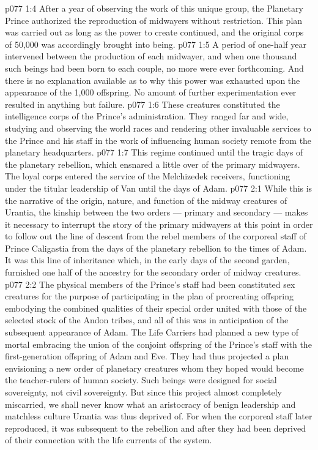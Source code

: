 \vs p077 1:4 After a year of observing the work of this unique group, the Planetary Prince authorized the reproduction of midwayers without restriction. This plan was carried out as long as the power to create continued, and the original corps of 50,000 was accordingly brought into being.
\vs p077 1:5 A period of one\hyp{}half year intervened between the production of each midwayer, and when one thousand such beings had been born to each couple, no more were ever forthcoming. And there is no explanation available as to why this power was exhausted upon the appearance of the 1,000 offspring. No amount of further experimentation ever resulted in anything but failure.
\vs p077 1:6 \pc These creatures constituted the intelligence corps of the Prince’s administration. They ranged far and wide, studying and observing the world races and rendering other invaluable services to the Prince and his staff in the work of influencing human society remote from the planetary headquarters.
\vs p077 1:7 This regime continued until the tragic days of the planetary rebellion, which ensnared a little over  of the primary midwayers. The loyal corps entered the service of the Melchizedek receivers, functioning under the titular leadership of Van until the days of Adam.
\vs p077 2:1 While this is the narrative of the origin, nature, and function of the midway creatures of Urantia, the kinship between the two orders --- primary and secondary --- makes it necessary to interrupt the story of the primary midwayers at this point in order to follow out the line of descent from the rebel members of the corporeal staff of Prince Caligastia from the days of the planetary rebellion to the times of Adam. It was this line of inheritance which, in the early days of the second garden, furnished one half of the ancestry for the secondary order of midway creatures.
\vs p077 2:2 \pc The physical members of the Prince’s staff had been constituted sex creatures for the purpose of participating in the plan of procreating offspring embodying the combined qualities of their special order united with those of the selected stock of the Andon tribes, and all of this was in anticipation of the subsequent appearance of Adam. The Life Carriers had planned a new type of mortal embracing the union of the conjoint offspring of the Prince’s staff with the first\hyp{}generation offspring of Adam and Eve. They had thus projected a plan envisioning a new order of planetary creatures whom they hoped would become the teacher\hyp{}rulers of human society. Such beings were designed for social sovereignty, not civil sovereignty. But since this project almost completely miscarried, we shall never know what an aristocracy of benign leadership and matchless culture Urantia was thus deprived of. For when the corporeal staff later reproduced, it was subsequent to the rebellion and after they had been deprived of their connection with the life currents of the system.
